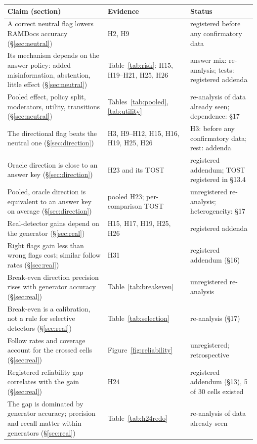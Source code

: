 \begin{table}[t]
\centering\footnotesize
\setlength{\tabcolsep}{4pt}
\begin{tabular}{p{7.4cm}p{3.6cm}p{4.2cm}}
\toprule
Claim (section) & Evidence & Status \\
\midrule
A correct neutral flag lowers RAMDocs accuracy (\S\ref{sec:neutral}) & H2, H9 & registered before any confirmatory data \\
Its mechanism depends on the answer policy: added misinformation, abstention, little effect (\S\ref{sec:neutral}) & Table~\ref{tab:risk}; H15, H19--H21, H25, H26 & answer mix: re-analysis; tests: registered addenda \\
Pooled effect, policy split, moderators, utility, transitions (\S\ref{sec:neutral}) & Tables~\ref{tab:pooled}, \ref{tab:utility} & re-analysis of data already seen; dependence: \S17 \\
The directional flag beats the neutral one (\S\ref{sec:direction}) & H3, H9--H12, H15, H16, H19, H25, H26 & H3: before any confirmatory data; rest: addenda \\
Oracle direction is close to an answer key (\S\ref{sec:direction}) & H23 and its TOST & registered addendum; TOST registered in \S13.4 \\
Pooled, oracle direction is equivalent to an answer key on average (\S\ref{sec:direction}) & pooled H23; per-comparison TOST & unregistered re-analysis; heterogeneity: \S17 \\
Real-detector gains depend on the generator (\S\ref{sec:real}) & H15, H17, H19, H25, H26 & registered addenda \\
Right flags gain less than wrong flags cost; similar follow rates (\S\ref{sec:real}) & H31 & registered addendum (\S16) \\
Break-even direction precision rises with generator accuracy (\S\ref{sec:real}) & Table~\ref{tab:breakeven} & unregistered re-analysis \\
Break-even is a calibration, not a rule for selective detectors (\S\ref{sec:real}) & Table~\ref{tab:selection} & re-analysis (\S17) \\
Follow rates and coverage account for the crossed cells (\S\ref{sec:real}) & Figure~\ref{fig:reliability} & unregistered; retrospective \\
Registered reliability gap correlates with the gain (\S\ref{sec:real}) & H24 & registered addendum (\S13), 5 of 30 cells existed \\
The gap is dominated by generator accuracy; precision and recall matter within generators (\S\ref{sec:real}) & Table~\ref{tab:h24redo} & re-analysis of data already seen \\

\end{tabular}
\end{table}

